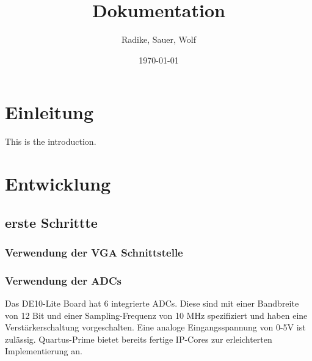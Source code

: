 \documentclass[a4paper,12pt]{article}
\begin{document}
\title{Dokumentation}
\author{Radike, Sauer, Wolf}
\date{\today}
\maketitle
\tableofcontents
\section{Einleitung}
This is the introduction.

\section{Entwicklung}
\subsection{erste Schrittte}
\subsubsection{Verwendung der VGA Schnittstelle}
\subsubsection{Verwendung der ADCs}
Das DE10-Lite Board hat 6 integrierte ADCs. Diese sind mit einer Bandbreite von 12 Bit und einer Sampling-Frequenz von 10 MHz spezifiziert und haben eine Verstärkerschaltung vorgeschalten. Eine analoge Eingangsspannung von 0-5V ist zulässig. Quartus-Prime bietet bereits fertige IP-Cores zur erleichterten Implementierung an.
 
\end{document}
